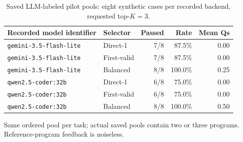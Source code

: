 \begin{table}[t]
\centering
\caption{Saved LLM-labeled pilot pools: eight synthetic cases per recorded backend, requested top-$K=3$.}
\label{tab:real_llm_results}
\footnotesize
\begin{tabularx}{\textwidth}{@{}Xlrrr@{}}
\toprule
Recorded model identifier & Selector & Passed & Rate & Mean Qs \\ \midrule
\texttt{gemini-3.5-flash-lite} & Direct-1 & 7/8 & 87.5\% & 0.00 \\
\texttt{gemini-3.5-flash-lite} & First-valid & 7/8 & 87.5\% & 0.00 \\
\texttt{gemini-3.5-flash-lite} & Balanced & 8/8 & 100.0\% & 0.25 \\
\texttt{qwen2.5-coder:32b} & Direct-1 & 6/8 & 75.0\% & 0.00 \\
\texttt{qwen2.5-coder:32b} & First-valid & 6/8 & 75.0\% & 0.00 \\
\texttt{qwen2.5-coder:32b} & Balanced & 8/8 & 100.0\% & 0.50 \\
\bottomrule
\end{tabularx}
\par\smallskip Same ordered pool per task; actual saved pools contain two or three programs. Reference-program feedback is noiseless.
\end{table}
